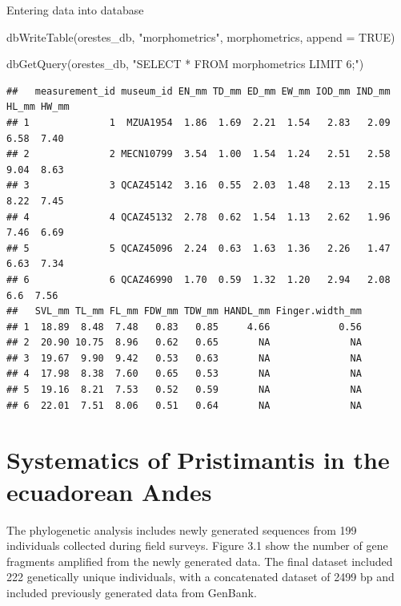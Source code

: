 \documentclass[
]{book}
\newenvironment{Shaded}{\begin{snugshade}}{\end{snugshade}}
\newcommand{\AttributeTok}[1]{\textcolor[rgb]{0.77,0.63,0.00}{#1}}
\newcommand{\ConstantTok}[1]{\textcolor[rgb]{0.00,0.00,0.00}{#1}}
\newcommand{\FunctionTok}[1]{\textcolor[rgb]{0.00,0.00,0.00}{#1}}
\newcommand{\NormalTok}[1]{#1}
\newcommand{\StringTok}[1]{\textcolor[rgb]{0.31,0.60,0.02}{#1}}
\begin{document}
Entering data into database

\begin{Shaded}
\begin{Highlighting}[]
\FunctionTok{dbWriteTable}\NormalTok{(orestes\_db, }\StringTok{"morphometrics"}\NormalTok{, morphometrics, }\AttributeTok{append =} \ConstantTok{TRUE}\NormalTok{)}

\FunctionTok{dbGetQuery}\NormalTok{(orestes\_db, }\StringTok{"SELECT * FROM morphometrics LIMIT 6;"}\NormalTok{)}
\end{Highlighting}
\end{Shaded}

\begin{verbatim}
##   measurement_id museum_id EN_mm TD_mm ED_mm EW_mm IOD_mm IND_mm HL_mm HW_mm
## 1              1  MZUA1954  1.86  1.69  2.21  1.54   2.83   2.09  6.58  7.40
## 2              2 MECN10799  3.54  1.00  1.54  1.24   2.51   2.58  9.04  8.63
## 3              3 QCAZ45142  3.16  0.55  2.03  1.48   2.13   2.15  8.22  7.45
## 4              4 QCAZ45132  2.78  0.62  1.54  1.13   2.62   1.96  7.46  6.69
## 5              5 QCAZ45096  2.24  0.63  1.63  1.36   2.26   1.47  6.63  7.34
## 6              6 QCAZ46990  1.70  0.59  1.32  1.20   2.94   2.08   6.6  7.56
##   SVL_mm TL_mm FL_mm FDW_mm TDW_mm HANDL_mm Finger.width_mm
## 1  18.89  8.48  7.48   0.83   0.85     4.66            0.56
## 2  20.90 10.75  8.96   0.62   0.65       NA              NA
## 3  19.67  9.90  9.42   0.53   0.63       NA              NA
## 4  17.98  8.38  7.60   0.65   0.53       NA              NA
## 5  19.16  8.21  7.53   0.52   0.59       NA              NA
## 6  22.01  7.51  8.06   0.51   0.64       NA              NA
\end{verbatim}

\hypertarget{systematics-of-pristimantis-in-the-ecuadorean-andes}{%
\chapter{Systematics of Pristimantis in the ecuadorean Andes}\label{systematics-of-pristimantis-in-the-ecuadorean-andes}}

The phylogenetic analysis includes newly generated sequences from 199 individuals collected during field surveys. Figure 3.1 show the number of gene fragments amplified from the newly generated data. The final dataset included 222 genetically unique individuals, with a concatenated dataset of 2499 bp and included previously generated data from GenBank.
\end{document}

